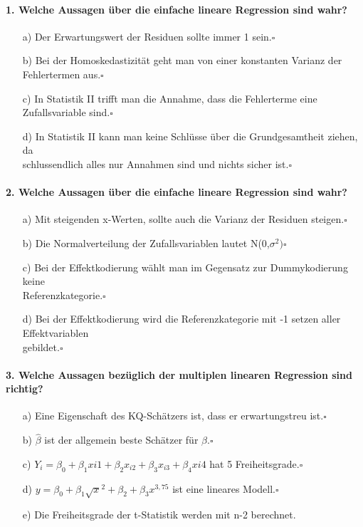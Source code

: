 \documentclass[a4paper]{article}
\begin{document}
\paragraph{1. Welche Aussagen über die einfache lineare Regression sind wahr?}
\begin{itemize}
    \item[a)]Der Erwartungswert der Residuen sollte immer 1 sein.\hfill $\square$
    \item[b)]Bei der Homoskedastizität geht man von einer konstanten Varianz der Fehlertermen aus.\hfill $\square$
    \item[c)]In Statistik II trifft man die Annahme, dass die Fehlerterme eine Zufallsvariable sind.\hfill $\square$
    \item[d)]In Statistik II kann man keine Schlüsse über die Grundgesamtheit ziehen, da\\ schlussendlich alles nur Annahmen sind und nichts sicher ist.\hfill $\square$
\end{itemize}

\paragraph{2. Welche Aussagen über die einfache lineare Regression sind wahr?}
\begin{itemize}
    \item[a)]Mit steigenden x-Werten, sollte auch die Varianz der Residuen steigen.\hfill $\square$
    \item[b)]Die Normalverteilung der Zufallsvariablen lautet N(0,$\sigma^2)$\hfill $\square$
    \item[c)]Bei der Effektkodierung wählt man im Gegensatz zur Dummykodierung keine\\ Referenzkategorie.\hfill $\square$
    \item[d)]Bei der Effektkodierung wird die Referenzkategorie mit -1 setzen aller Effektvariablen \\gebildet.\hfill $\square$
\end{itemize}

\paragraph{3. Welche Aussagen bezüglich der multiplen linearen Regression sind richtig?}
\begin{itemize}
    \item[a)]Eine Eigenschaft des KQ-Schätzers ist, dass er erwartungstreu ist.\hfill $\square$
    \item[b)]$\hat\beta$ ist der allgemein beste Schätzer für $\beta$.\hfill $\square$
    \item[c)]$Y_i=\beta_0+\beta_1x{i1}+\beta_2x_{i2}+\beta_3x_{i3}+\beta_4x{i4}$ hat 5 Freiheitsgrade.\hfill $\square$
    \item[d)]$y=\beta_0+\beta_1\sqrt{x}^2+\beta_2+\beta_3x^{3,75}$ ist eine lineares Modell.\hfill $\square$
    \item[e)]Die Freiheitsgrade der t-Statistik werden mit n-2 berechnet.
\end{itemize}
\end{document}
